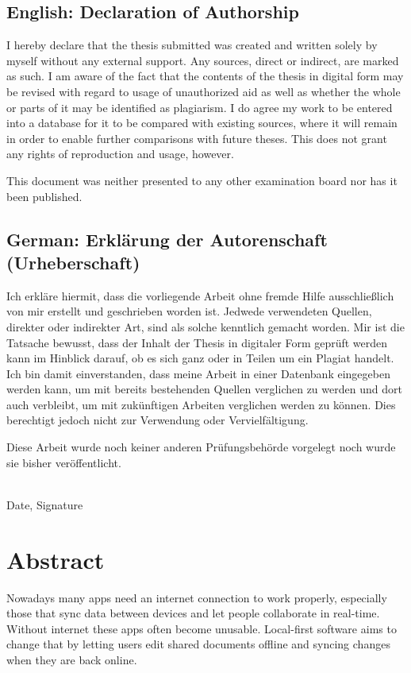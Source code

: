 \documentclass[a4paper, 11pt, oneside]{article}
\theoremstyle{definition}
\begin{document}
\subsection*{English: Declaration of Authorship}

I hereby declare that the thesis submitted was created and written solely by
myself without any external support. Any sources, direct or indirect, are marked
as such. I am aware of the fact that the contents of the thesis in digital
form may be revised with regard to usage of unauthorized aid as well as
whether the whole or parts of it may be identified as plagiarism. I do agree my
work to be entered into a database for it to be compared with existing sources,
where it will remain in order to enable further comparisons with future theses.
This does not grant any rights of reproduction and usage, however.

This document was neither presented to any other examination board nor has it
been published.

\subsection*{German: Erklärung der Autorenschaft (Urheberschaft)}

Ich erkläre hiermit, dass die vorliegende Arbeit ohne fremde Hilfe
ausschließlich von mir erstellt und geschrieben worden ist. Jedwede verwendeten
Quellen, direkter oder indirekter Art, sind als solche kenntlich gemacht worden.
Mir ist die Tatsache bewusst, dass der Inhalt der Thesis in digitaler Form geprüft
werden kann im Hinblick darauf, ob es sich ganz oder in Teilen um ein Plagiat
handelt. Ich bin damit einverstanden, dass meine Arbeit in einer Datenbank
eingegeben werden kann, um mit bereits bestehenden Quellen verglichen zu werden
und dort auch verbleibt, um mit zukünftigen Arbeiten verglichen werden zu
können. Dies berechtigt jedoch nicht zur Verwendung oder Vervielfältigung.

Diese Arbeit wurde noch keiner anderen Prüfungsbehörde vorgelegt noch wurde sie
bisher veröffentlicht.

\vspace{20mm}

\dotfill\\ Date, Signature

\newpage

\section*{Abstract}
Nowadays many apps need an internet connection to work properly, especially those that sync data between devices and let people collaborate in real-time. Without internet these apps often become unusable. Local-first software aims to change that by letting users edit shared documents offline and syncing changes when they are back online.
\end{document}
